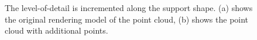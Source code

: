 \begin{figure}
\centering
{}
\caption[Example of the local increment of level-of-detail]
{The level-of-detail is incremented along the support shape. (a) shows the original rendering model of the point cloud, (b) shows the point cloud with additional points. }
\label{fig:technologiezentrum_lod_increment}
\end{figure}




